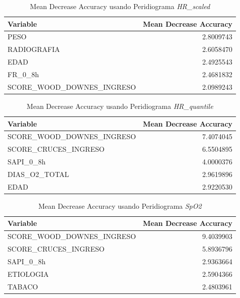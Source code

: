 \begin{table}[H]
    \centering
    \begin{tabular}{lr}
        \toprule
        \textbf{Variable} & \textbf{Mean Decrease Accuracy} \\
        \midrule
        PESO & 2.8009743 \\
        RADIOGRAFIA & 2.6058470 \\
        EDAD & 2.4925543 \\
        FR\_0\_8h & 2.4681832 \\
        SCORE\_WOOD\_DOWNES\_INGRESO & 2.0989243 \\
        \bottomrule
    \end{tabular}
    \caption{Mean Decrease Accuracy usando Peridiograma \textit{HR\_scaled}}
\end{table}

\begin{table}[H]
    \centering
    \begin{tabular}{lr}
        \toprule
        \textbf{Variable} & \textbf{Mean Decrease Accuracy} \\
        \midrule
        SCORE\_WOOD\_DOWNES\_INGRESO & 7.4074045 \\
        SCORE\_CRUCES\_INGRESO & 6.5504895 \\
        SAPI\_0\_8h & 4.0000376 \\
        DIAS\_O2\_TOTAL & 2.9619896 \\
        EDAD & 2.9220530 \\
        \bottomrule
    \end{tabular}
    \caption{Mean Decrease Accuracy usando Peridiograma \textit{HR\_quantile}} 
\end{table}

\begin{table}[H]
    \centering
    \begin{tabular}{lr}
        \toprule
        \textbf{Variable} & \textbf{Mean Decrease Accuracy} \\
        \midrule
        SCORE\_WOOD\_DOWNES\_INGRESO & 9.4039903 \\
        SCORE\_CRUCES\_INGRESO & 5.8936796 \\
        SAPI\_0\_8h & 2.9363664 \\
        ETIOLOGIA & 2.5904366 \\
        TABACO & 2.4803961 \\
        \bottomrule
    \end{tabular}
    \caption{Mean Decrease Accuracy usando Peridiograma \textit{SpO2}}
\end{table}


